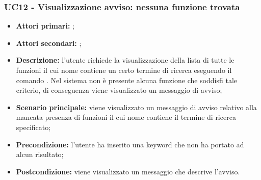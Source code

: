 \subsubsection{UC12 - Visualizzazione avviso: nessuna funzione trovata}
\begin{itemize}
	\item \textbf{Attori primari:} \ua{};
	\item \textbf{Attori secondari:} \re{};
	\item \textbf{Descrizione:} l’utente richiede la visualizzazione della lista di tutte le funzioni il cui nome contiene un certo termine di ricerca eseguendo il comando \psearch{}. Nel sistema non è presente alcuna funzione che soddisfi tale criterio, di conseguenza viene visualizzato un messaggio di avviso;
	\item \textbf{Scenario principale:} viene visualizzato un messaggio di avviso relativo alla mancata presenza di funzioni il cui nome contiene il termine di ricerca specificato;
	\item \textbf{Precondizione:} l’utente ha inserito una keyword che non ha portato ad alcun risultato;
	\item \textbf{Postcondizione:} viene visualizzato un messaggio che descrive l'avviso.
\end{itemize}